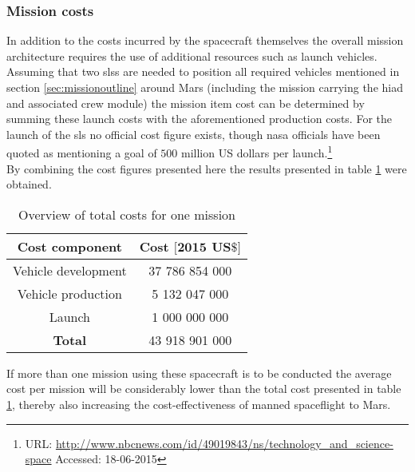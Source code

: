 \subsubsection{Mission costs}
In addition to the costs incurred by the spacecraft themselves the overall mission architecture requires the use of additional resources such as launch vehicles. Assuming that two \glspl{sls} are needed to position all required vehicles mentioned in section \ref{sec:missionoutline} around Mars (including the mission carrying the \gls{hiad} and associated crew module) the mission item cost can be determined by summing these launch costs with the aforementioned production costs. For the launch of the \gls{sls} no official cost figure exists, though \gls{nasa} officials have been quoted as mentioning a goal of $500$ million US dollars per launch.\footnote{URL: \url{http://www.nbcnews.com/id/49019843/ns/technology_and_science-space} Accessed: 18-06-2015}\\
By combining the cost figures presented here the results presented in table \ref{tab:missioncosts} were obtained.
\begin{table}
	\centering
	\caption{Overview of total costs for one mission}
	\begin{tabular}{|c|c|}
		\hline
		\textbf{Cost component} & \textbf{Cost $\mathbf{[2015}$ $\mathbf{US\$]}$} \\ \hline 
		\hline
		Vehicle development & 37 786 854 000 \\
		Vehicle production & 5 132 047 000\\
		Launch & 1 000 000 000\\ \hline
		\textbf{Total} & 43 918 901 000\\ \hline
	\end{tabular}
	\label{tab:missioncosts}
\end{table}
If more than one mission using these spacecraft is to be conducted the average cost per mission will be considerably lower than the total cost presented in table \ref{tab:missioncosts}, thereby also increasing the cost-effectiveness of manned spaceflight to Mars.